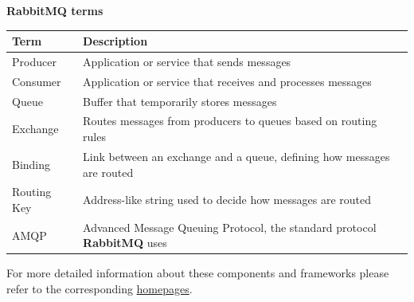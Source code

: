 \vspace{2ex}

\textbf{RabbitMQ terms}

\begin{tabular}{|l|p{12cm}|}
\hline
\textbf{Term} & \textbf{Description} \\
\hline
Producer & Application or service that sends messages \\
\hline
Consumer & Application or service that receives and processes messages \\
\hline
Queue & Buffer that temporarily stores messages \\
\hline
Exchange & Routes messages from producers to queues based on routing rules \\
\hline
Binding & Link between an exchange and a queue, defining how messages are routed \\
\hline
Routing Key & Address-like string used to decide how messages are routed \\
\hline
AMQP & Advanced Message Queuing Protocol, the standard protocol \textbf{RabbitMQ} uses \\
\hline
\end{tabular}

\vspace{2ex}

For more detailed information about these components and frameworks please refer to the
corresponding \hyperref[LINKS]{homepages}.








